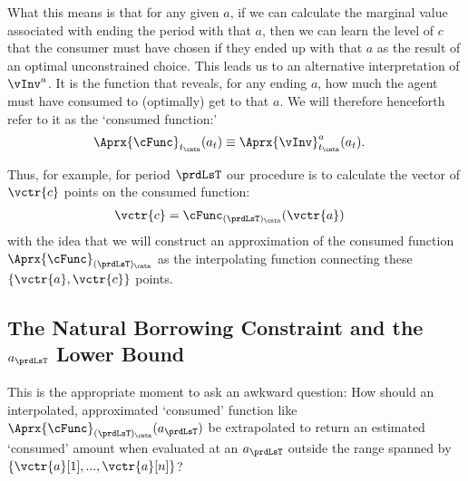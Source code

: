 \documentclass[titlepage, headings=optiontotocandhead]{Resources/texmf-local/tex/latex/econtex}
\begin{document}
What this means is that for any given $a$, if we can calculate the marginal value associated with ending the period with that $a$, then we can learn the level of $c$ that the consumer must have chosen if they ended up with that $a$ as the result of an optimal unconstrained choice.  This leads us to an alternative interpretation of $\vInv^{a}$. It is the function that reveals, for any ending $a$, how much the agent must have consumed to (optimally) get to that $a$.  We will therefore henceforth refer to it as the `consumed function:'
\begin{equation}\begin{gathered}\begin{aligned}
      \Aprx{\cFunc}_{t_\cntn}(a_{t}) & \equiv \Aprx{\vInv}^{a}_{t_\cntn}(a_{t}) \label{eq:consumedfn}.    
    \end{aligned}\end{gathered}\end{equation}

Thus, for example, for period $\prdLsT$ our procedure is to calculate the vector of $\vctr{c}$ points on the consumed function:
\begin{equation}\begin{gathered}\begin{aligned}
      \vctr{c} & = \cFunc_{(\prdLsT)_\cntn}(\vctr{a}) \label{eq:consumedfnvecs}     
    \end{aligned}\end{gathered}\end{equation}
with the idea that we will construct an approximation of the consumed function $\Aprx{\cFunc}_{(\prdLsT)_\cntn}$ as the interpolating function connecting these $\{\vctr{a},\vctr{c}\}$ points.

\hypertarget{the-natural-borrowing-constraint-and-the-a-lower-bound}{}
\subsection{The Natural Borrowing Constraint and the $a_{\prdLsT}$ Lower Bound} \label{subsec:LiqConstrSelfImposed}

This is the appropriate moment to ask an awkward question: How should an interpolated, approximated `consumed' function like $\Aprx{\cFunc}_{(\prdLsT)_\cntn}(a_{\prdLsT})$ be extrapolated to return an estimated `consumed' amount when evaluated at an $a_{\prdLsT}$ outside the range spanned by $\{\vctr{a}[1],...,\vctr{a}[n]\}$?
\end{document}
